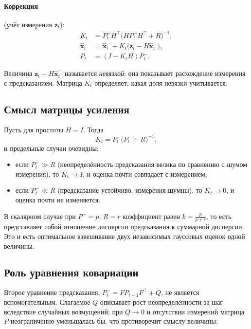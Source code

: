 \documentclass[11pt,a4paper]{article}
\theoremstyle{definition}
\theoremstyle{remark}
\begin{document}
\paragraph{Коррекция} (учёт измерения $\mathbf{z}_t$):
\begin{align}
  K_t &= P^-_t H^\top \bigl(H P^-_t H^\top + R\bigr)^{-1}, \\
  \hat{\mathbf{x}}_t &= \hat{\mathbf{x}}^-_t + K_t\bigl(\mathbf{z}_t - H\hat{\mathbf{x}}^-_t\bigr), \\
  P_t &= (I - K_t H) P^-_t .
\end{align}

Величина $\mathbf{z}_t - H\hat{\mathbf{x}}^-_t$ называется \emph{невязкой}:
она показывает расхождение измерения с предсказанием. Матрица $K_t$
определяет, какая доля невязки учитывается.

\subsection{Смысл матрицы усиления}

Пусть для простоты $H = I$. Тогда
\[
  K_t = P^-_t \bigl(P^-_t + R\bigr)^{-1},
\]
и предельные случаи очевидны:

\begin{itemize}
  \item если $P^-_t \gg R$ (неопределённость предсказания велика по сравнению
        с шумом измерения), то $K_t \to I$, и оценка почти совпадает с
        измерением;
  \item если $P^-_t \ll R$ (предсказание устойчиво, измерения шумны), то
        $K_t \to 0$, и оценка почти не изменяется.
\end{itemize}

В скалярном случае при $P^- = p$, $R = r$ коэффициент равен
$k = \frac{p}{p+r}$, то есть представляет собой отношение дисперсии
предсказания к суммарной дисперсии. Это и есть оптимальное взвешивание двух
независимых гауссовых оценок одной величины.

\subsection{Роль уравнения ковариации}

Второе уравнение предсказания, $P^-_t = F P_{t-1} F^\top + Q$, не является
вспомогательным. Слагаемое $Q$ описывает рост неопределённости за шаг
вследствие случайных возмущений; при $Q \to 0$ и отсутствии измерений
матрица $P$ неограниченно уменьшалась бы, что противоречит смыслу величины.
\end{document}
